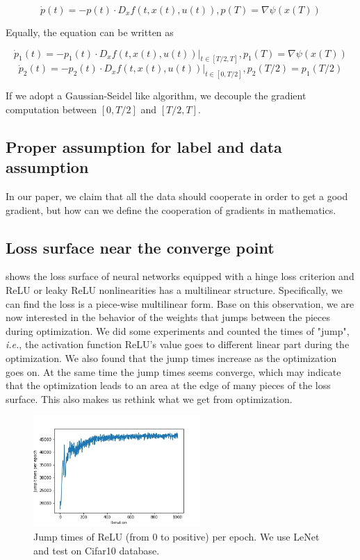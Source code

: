 \documentclass{article}
\theoremstyle{plain}
\theoremstyle{definition}
\begin{document}
$$
\dot p(t) = -p(t)\cdot D_xf(t,x(t),u(t)),p(T)=\nabla \psi(x(T))
$$

Equally, the equation can be written as

$$
\dot p_1(t) = -p_1(t)\cdot D_xf(t,x(t),u(t))|_{t\in[T/2,T]},p_1(T)=\nabla \psi(x(T))$$
$$
\dot p_2(t) = -p_2(t)\cdot D_xf(t,x(t),u(t))|_{t\in[0,T/2]},p_2(T/2)=p_1(T/2)
$$

If we adopt a Gaussian-Seidel like algorithm, we decouple the gradient computation between $[0,T/2]$ and $[T/2,T]$.

\subsection{Proper assumption for label and data assumption}

In our paper, we claim that all the data should cooperate in order to get a good gradient, but how can we define the cooperation of gradients in mathematics.

\subsection{Loss surface near the converge point}
\cite{DBLP:journals/corr/abs-1712-10132} shows the loss surface of neural networks equipped with a hinge loss criterion and ReLU or leaky ReLU nonlinearities has a multilinear structure. Specifically, we can find the loss is a piece-wise multilinear form. Base on this observation, we are now interested in the behavior of the weights that jumps between the pieces during optimization.
We did some experiments and counted the times of "jump", \emph{i.e.}, the activation function ReLU's value goes to different linear part during the optimization. We also found that the jump times increase as the optimization goes on. At the same time the jump times seems converge, which may indicate that the optimization leads to an area at the edge of many pieces of the loss surface. This also makes us rethink what we get from optimization.

\begin{figure}[H]
    \centering
    \includegraphics[width=2.5in]{PieceJump.jpg}
    \caption{Jump times of ReLU (from $0$ to positive) per epoch. We use LeNet and test on Cifar10 database.}
    \label{piecejump}
\end{figure}



\end{document}
